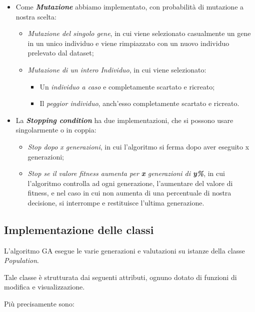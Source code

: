 \documentclass{article}
\begin{document}
\begin{itemize}
\item Come \textit{\textbf{Mutazione}} abbiamo implementato, con probabilità di mutazione a nostra scelta:
\begin{itemize}
\item \textit{Mutazione del singolo gene}, in cui viene selezionato casualmente un gene in un unico individuo e viene rimpiazzato con un nuovo individuo prelevato dal dataset;
\item \textit{Mutazione di un intero Individuo}, in cui viene selezionato:
    \begin{itemize}
        \item Un \textit{individuo a caso} e completamente scartato e ricreato;
        \item Il \textit{peggior individuo}, anch'esso completamente scartato e ricreato.
    \end{itemize}
\end{itemize}

\item La \textit{\textbf{Stopping condition}} ha due implementazioni, che si possono usare singolarmente o in coppia:
\begin{itemize}
    \item \textit{Stop dopo x generazioni}, in cui l'algoritmo si ferma dopo aver eseguito x generazioni;
    \item \textit{Stop se il valore fitness aumenta per \textbf{x} generazioni di \textbf{y\%}}, in cui l'algoritmo controlla ad ogni generazione, l'aumentare del valore di fitness, e nel caso in cui non aumenta di una percentuale di nostra decisione, si interrompe e restituisce l'ultima generazione.
\end{itemize}
\end{itemize}

\bigskip

\subsection{Implementazione delle classi}

L'algoritmo GA esegue le varie generazioni e valutazioni su istanze della classe \textit{Population}.

Tale classe è strutturata dai seguenti attributi, ognuno dotato di funzioni di modifica e visualizzazione.

Più precisamente sono:
\end{document}
